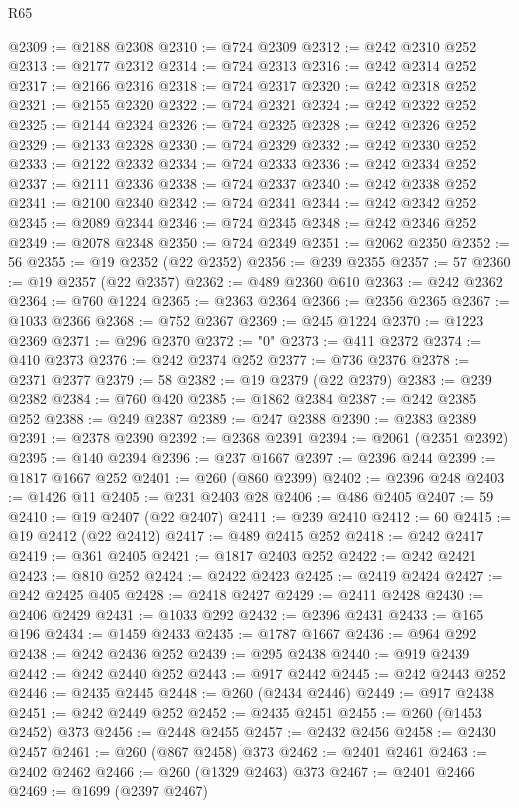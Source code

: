 \begin{lexlean}{R65}
\begin{coremodule}
{@2309 := @2188 @2308
@2310 := @724 @2309
@2312 := @242 @2310 @252
@2313 := @2177 @2312
@2314 := @724 @2313
@2316 := @242 @2314 @252
@2317 := @2166 @2316
@2318 := @724 @2317
@2320 := @242 @2318 @252
@2321 := @2155 @2320
@2322 := @724 @2321
@2324 := @242 @2322 @252
@2325 := @2144 @2324
@2326 := @724 @2325
@2328 := @242 @2326 @252
@2329 := @2133 @2328
@2330 := @724 @2329
@2332 := @242 @2330 @252
@2333 := @2122 @2332
@2334 := @724 @2333
@2336 := @242 @2334 @252
@2337 := @2111 @2336
@2338 := @724 @2337
@2340 := @242 @2338 @252
@2341 := @2100 @2340
@2342 := @724 @2341
@2344 := @242 @2342 @252
@2345 := @2089 @2344
@2346 := @724 @2345
@2348 := @242 @2346 @252
@2349 := @2078 @2348
@2350 := @724 @2349
@2351 := @2062 @2350
@2352 := 56
@2355 := @19 @2352 (@22 @2352)
@2356 := @239 @2355
@2357 := 57
@2360 := @19 @2357 (@22 @2357)
@2362 := @489 @2360 @610
@2363 := @242 @2362
@2364 := @760 @1224
@2365 := @2363 @2364
@2366 := @2356 @2365
@2367 := @1033 @2366
@2368 := @752 @2367
@2369 := @245 @1224
@2370 := @1223 @2369
@2371 := @296 @2370
@2372 := "0"
@2373 := @411 @2372
@2374 := @410 @2373
@2376 := @242 @2374 @252
@2377 := @736 @2376
@2378 := @2371 @2377
@2379 := 58
@2382 := @19 @2379 (@22 @2379)
@2383 := @239 @2382
@2384 := @760 @420
@2385 := @1862 @2384
@2387 := @242 @2385 @252
@2388 := @249 @2387
@2389 := @247 @2388
@2390 := @2383 @2389
@2391 := @2378 @2390
@2392 := @2368 @2391
@2394 := @2061 (@2351 @2392)
@2395 := @140 @2394
@2396 := @237 @1667
@2397 := @2396 @244
@2399 := @1817 @1667 @252
@2401 := @260 (@860 @2399)
@2402 := @2396 @248
@2403 := @1426 @11
@2405 := @231 @2403 @28
@2406 := @486 @2405
@2407 := 59
@2410 := @19 @2407 (@22 @2407)
@2411 := @239 @2410
@2412 := 60
@2415 := @19 @2412 (@22 @2412)
@2417 := @489 @2415 @252
@2418 := @242 @2417
@2419 := @361 @2405
@2421 := @1817 @2403 @252
@2422 := @242 @2421
@2423 := @810 @252
@2424 := @2422 @2423
@2425 := @2419 @2424
@2427 := @242 @2425 @405
@2428 := @2418 @2427
@2429 := @2411 @2428
@2430 := @2406 @2429
@2431 := @1033 @292
@2432 := @2396 @2431
@2433 := @165 @196
@2434 := @1459 @2433
@2435 := @1787 @1667
@2436 := @964 @292
@2438 := @242 @2436 @252
@2439 := @295 @2438
@2440 := @919 @2439
@2442 := @242 @2440 @252
@2443 := @917 @2442
@2445 := @242 @2443 @252
@2446 := @2435 @2445
@2448 := @260 (@2434 @2446)
@2449 := @917 @2438
@2451 := @242 @2449 @252
@2452 := @2435 @2451
@2455 := @260 (@1453 @2452) @373
@2456 := @2448 @2455
@2457 := @2432 @2456
@2458 := @2430 @2457
@2461 := @260 (@867 @2458) @373
@2462 := @2401 @2461
@2463 := @2402 @2462
@2466 := @260 (@1329 @2463) @373
@2467 := @2401 @2466
@2469 := @1699 (@2397 @2467)
}
\end{coremodule}
\end{lexlean}

